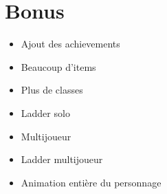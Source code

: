 \documentclass[16pt, oneside]{report}
\begin{document}
\chapter{Bonus}
\begin{itemize}
	\item Ajout des achievements
	\item Beaucoup d'items
	\item Plus de classes
	\item Ladder solo
	\item Multijoueur
	\item Ladder multijoueur
	\item Animation enti\`ere du personnage
\end{itemize}
\end{document}

